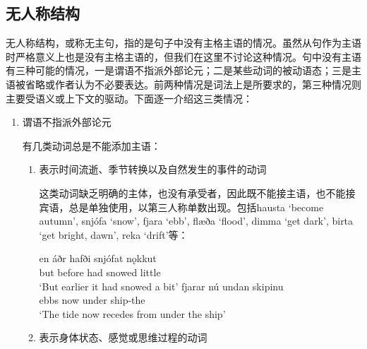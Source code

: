 \subsection{无人称结构}
\label{sec:impersonal}
无人称结构，或称无主句，指的是句子中没有主格主语的情况。虽然从句作为主语时严格意义上也是没有主格主语的，但我们在这里不讨论这种情况。句中没有主语有三种可能的情况，一是谓语不指派外部论元；二是某些动词的被动语态；三是主语被省略或作者认为不必要表达。前两种情况是词法上是所要求的，第三种情况则主要受语义或上下文的驱动。下面逐一介绍这三类情况：
\begin{enumerate}
    \setlength{\parindent}{2em}
    \item 谓语不指派外部论元

          有几类动词总是不能添加主语：
          \begin{enumerate}
              \setlength{\parindent}{2em}
              \item 表示时间流逝、季节转换以及自然发生的事件的动词

                    这类动词缺乏明确的主体，也没有承受者，因此既不能接主语，也不能接宾语，总是单独使用，以第三人称单数出现。包括hausta `become autumn’, snjófa `snow’, fjara `ebb’, flæða `flood’, dimma `get dark’, birta `get bright, dawn’, reka `drift’等：
                    \begin{exe}
                        \ex
                        \gll en	áðr	hafði	snjófat	nǫkkut\\
                        but	before	had	snowed	little\\
                        \trans `But earlier it had snowed a bit’
                        \ex \gll
                        fjarar	nú	undan	skipinu\\
                        ebbs	now	under	ship-the\\
                        \trans `The tide now recedes from under the ship’
                    \end{exe}

              \item 表示身体状态、感觉或思维过程的动词


\end{enumerate}
\end{enumerate}
